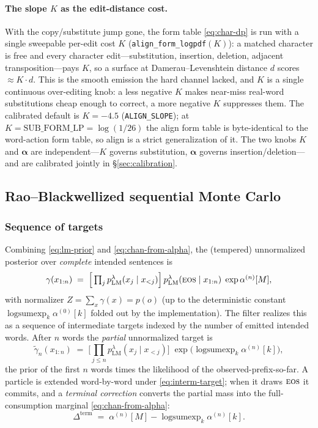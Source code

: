 \documentclass[11pt]{article}
\providecommand{\given}{\mid}
\providecommand{\pLM}{p_{\mathrm{LM}}}
\providecommand{\eos}{\textsc{eos}}
\providecommand{\lse}{\operatorname{logsumexp}}
\providecommand{\code}[1]{\texttt{#1}}
\begin{document}
\paragraph{The slope $K$ as the edit-distance cost.} With the copy/substitute jump gone, the form table \eqref{eq:char-dp} is run with a single sweepable per-edit cost $K$ (\code{align\_form\_logpdf}$(K)$): a matched character is free and every character edit---substitution, insertion, deletion, adjacent transposition---pays $K$, so a surface at Damerau--Levenshtein distance $d$ scores $\approx K\cdot d$. This is the smooth emission the hard channel lacked, and $K$ is a single continuous over-editing knob: a less negative $K$ makes near-miss real-word substitutions cheap enough to correct, a more negative $K$ suppresses them. The calibrated default is $K = -4.5$ (\code{ALIGN\_SLOPE}); at $K = \mathrm{SUB\_FORM\_LP} = \log(1/26)$ the align form table is byte-identical to the word-action form table, so align is a strict generalization of it. The two knobs $K$ and $\bm\alpha$ are independent---$K$ governs substitution, $\bm\alpha$ governs insertion/deletion---and are calibrated jointly in \S\ref{sec:calibration}.

\subsection{Rao--Blackwellized sequential Monte Carlo}
\label{sec:smc}

\subsubsection{Sequence of targets}

Combining \eqref{eq:lm-prior} and \eqref{eq:chan-from-alpha}, the (tempered) unnormalized posterior over \emph{complete} intended sentences is
\begin{equation}\label{eq:final-target}
  \gamma(x_{1:n}) \;=\; \Big[\textstyle\prod_{j} \pLM^{\lambda}(x_j\given x_{<j})\Big]\,
                        \pLM^{\lambda}(\eos\given x_{1:n})\;\exp\alpha^{(n)}[M],
\end{equation}
with normalizer $Z = \sum_{x} \gamma(x) = p(o)$ (up to the deterministic constant $\lse_k\alpha^{(0)}[k]$ folded out by the implementation). The filter realizes this as a sequence of intermediate targets indexed by the number of emitted intended words. After $n$ words the \emph{partial} unnormalized target is
\begin{equation}\label{eq:interm-target}
  \tilde\gamma_n(x_{1:n}) \;=\; \Big[\textstyle\prod_{j\le n} \pLM^{\lambda}(x_j\given x_{<j})\Big]\;
                        \exp\Big(\lse_k \alpha^{(n)}[k]\Big),
\end{equation}
the prior of the first $n$ words times the likelihood of the observed-prefix-so-far. A particle is extended word-by-word under \eqref{eq:interm-target}; when it draws $\eos$ it commits, and a \emph{terminal correction} converts the partial mass into the full-consumption marginal \eqref{eq:chan-from-alpha}:
\begin{equation}\label{eq:term-correction}
  \Delta^{\mathrm{term}} \;=\; \alpha^{(n)}[M] - \lse_k \alpha^{(n)}[k].
\end{equation}
\end{document}
